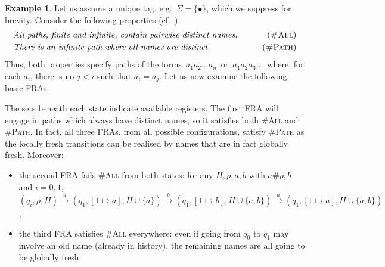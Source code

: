 \documentclass[10pt,a4paper]{article}
\theoremstyle{definition}
\newtheorem{example}[theorem]{Example}
\theoremstyle{remark}
\newcommand\Lfr[1]{#1^\bullet}
\newcommand\Gfr[1]{#1^\circledast}
\begin{document}
\begin{example}\label{example:freshPaths}
  Let us assume a unique tag, e.g.\ $\Sigma=\{\bullet\}$, which we suppress for brevity.  
  Consider the following properties (cf.~\cite{KlinHD}):
  \begin{align*}
    &\text{\em All paths, finite and infinite, contain pairwise distinct names.}&\tag{\textsc{\#All}}\\
    &\text{\em There is an infinite path where all names are distinct.}&\tag{\textsc{\#Path}}
\end{align*}
Thus, both properties specify paths of the forms\ $a_1 a_2 \dots a_n$\ or\ $a_1 a_2a_3 \dots$\
where, for each $a_i$, there is no $j < i$ such that $a_i = a_j$. Let us now examine the following basic FRAs.

\noindent
\begin{centering}

\end{centering}
\noindent
The sets beneath each state indicate available registers. The first FRA will engage in paths which always have distinct names, so it satisfies both \textsc{\#All} and \textsc{\#Path}. In fact, all three FRAs, from all possible configurations, satisfy \textsc{\#Path} as the locally fresh transitions can be realised by names that are in fact globally fresh. Moreover:
\begin{itemize}
\item the second FRA fails \textsc{\#All} from both states: for any $H,\rho,a,b$ with $a\#\rho, b$ and $i=0,1$, $(q_i,\rho,H)\xrightarrow{a}(q_1,[1\mapsto a],H\cup\{a\})\xrightarrow{b}(q_1,[1\mapsto b],H\cup\{a,b\})\xrightarrow{a}(q_1,[1\mapsto a],H\cup\{a,b\})$;
\item the third FRA satisfies \textsc{\#All} everywhere: even if going from $q_0$ to $q_1$ may involve an old name (already in history), the remaining names are all going to be globally fresh.
\end{itemize}
\end{example}
\end{document}
